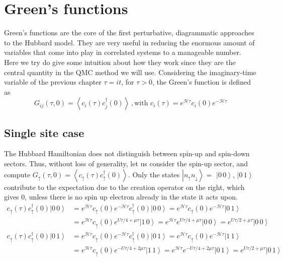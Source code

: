 \section{Green's functions}\label{sec:green}

Green's functions are the core of the first perturbative, diagrammatic approaches to the Hubbard model.
They are very useful in reducing the enormous amount of variables that come into play in correlated systems to a manageable number.
Here we try do give some intuition about how they work since they are the central quantity in the \acs{QMC} method we will use.
Considering the imaginary-time variable of the previous chapter $\tau = i t$, for $\tau > 0$, the Green's function is defined as
\begin{equation}
G_{i  j} ( \tau, 0 ) = \left\langle c_{i} ( \tau ) c_{j}^\dagger ( 0 ) \right\rangle  \, , \text{with} \,\, c_{i} ( \tau ) = e^{\mathcal{H} \tau } c_{i} ( 0 ) e^{- \mathcal{H} \tau } 
\end{equation}

\subsection{Single site case}

The Hubbard Hamiltonian does not distinguish between spin-up and spin-down sectors.
Thus, without loss of generality, let us consider the spin-up sector, and compute $G_\uparrow (\tau, 0) =  \left\langle c_{\uparrow} ( \tau) c_{\uparrow}^\dagger ( 0 ) \right\rangle$.
Only the states $\left| n_{\uparrow} n_{\downarrow} \right\rangle = $ $\left| 0\, 0 \right\rangle$, $\left| 0\, 1 \right\rangle$ contribute to the expectation due to the creation operator on the right, which gives 0, unless there is no spin up electron already in the state it acts upon.
\begin{equation}
\begin{split}
c_{\uparrow} ( \tau) c_{\uparrow}^\dagger ( 0 )  \left| 0\, 0 \right\rangle &= e^{\mathcal{H} \tau } c_{\uparrow} ( 0 ) e^{-\mathcal{H} \tau } c_{\uparrow}^\dagger ( 0 )  \left| 0\, 0 \right\rangle = e^{\mathcal{H} \tau } c_{\uparrow} ( 0 ) e^{-\mathcal{H} \tau } \left| 0\, 1 \right\rangle \\
 &= e^{\mathcal{H} \tau } c_{\uparrow} ( 0 ) e^{U \tau / 4 + \mu \tau } \left| 1\, 0 \right\rangle = e^{\mathcal{H} \tau } e^{U \tau / 4 + \mu \tau } \left| 0\, 0 \right\rangle = e^{U \tau / 2 + \mu \tau } \left| 0\, 0 \right\rangle \\
 c_{\uparrow} ( \tau) c_{\uparrow}^\dagger ( 0 )  \left| 0\, 1 \right\rangle &= e^{\mathcal{H} \tau } c_{\uparrow} ( 0 ) e^{-\mathcal{H} \tau } c_{\uparrow}^\dagger ( 0 )  \left| 0\, 1 \right\rangle = e^{\mathcal{H} \tau } c_{\uparrow} ( 0 ) e^{-\mathcal{H} \tau } \left| 1\, 1 \right\rangle \\
 &= e^{\mathcal{H} \tau } c_{\uparrow} ( 0 ) e^{- U \tau / 4 + 2 \mu \tau } \left| 1\, 1 \right\rangle = e^{\mathcal{H} \tau } e^{- U \tau / 4 + 2 \mu \tau } \left| 0\, 1 \right\rangle = e^{U \tau / 2 + \mu \tau } \left| 0\, 1 \right\rangle
\end{split}
\end{equation}

